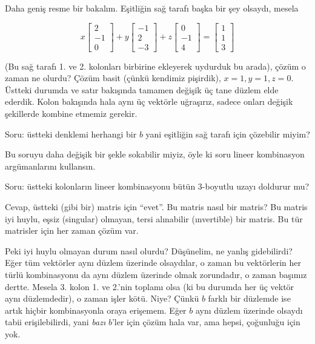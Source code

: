 \documentclass[12pt,fleqn]{article}\usepackage{../../common}
\begin{document}
Daha geniş resme bir bakalım. Eşitliğin sağ tarafı başka bir şey olsaydı,
mesela

$$ 
x 
\left[\begin{array}{r}
2 \\
-1 \\
0
\end{array}\right]
+
y
\left[\begin{array}{r}
-1 \\
2 \\
-3
\end{array}\right]
+
z 
\left[\begin{array}{r}
0 \\
-1 \\
4
\end{array}\right]
=
\left[\begin{array}{r}
1 \\
1 \\
3
\end{array}\right]
 $$

(Bu sağ tarafı 1. ve 2. kolonları birbirine ekleyerek uydurduk bu arada),
çözüm o zaman ne olurdu? Çözüm basit (çünkü kendimiz pişirdik),
$x=1,y=1,z=0$. Üstteki durumda ve satır bakışında tamamen değişik üç tane
düzlem elde ederdik. Kolon bakışında hala aynı üç vektörle uğraşırız,
sadece onları değişik şekillerde kombine etmemiz gerekir. 

Soru: üstteki denklemi herhangi bir $b$ yani eşitliğin sağ tarafı için
çözebilir miyim? 

Bu soruyu daha değişik bir şekle sokabilir miyiz, öyle ki soru lineer
kombinasyon argümanlarını kullansın. 

Soru: üstteki kolonların lineer kombinasyonu bütün 3-boyutlu uzayı doldurur
mu?

Cevap, üstteki (gibi bir) matris için ``evet''. Bu matris nasıl bir matris?
Bu matris iyi huylu, eşsiz (singular) olmayan, tersi alınabilir
(ınvertible) bir matris. Bu tür matrisler için her zaman çözüm var. 

Peki iyi huylu olmayan durum nasıl olurdu? Düşünelim, ne yanlış
gidebilirdi? Eğer tüm vektörler aynı düzlem üzerinde olsaydılar, o zaman bu
vektörlerin her türlü kombinasyonu da aynı düzlem üzerinde olmak
zorundadır, o zaman başımız dertte. Mesela 3. kolon 1. ve 2.'nin toplamı
olsa (ki bu durumda her üç vektör aynı düzlemdedir), o zaman işler
kötü. Niye? Çünkü $b$ farklı bir düzlemde ise artık hiçbir kombinasyonla
oraya erişemem. Eğer $b$ aynı düzlem üzerinde olsaydı tabii erişilebilirdi,
yani {\em bazı} $b$'ler için çözüm hala var, ama hepsi, çoğunluğu için yok. 
\end{document}
